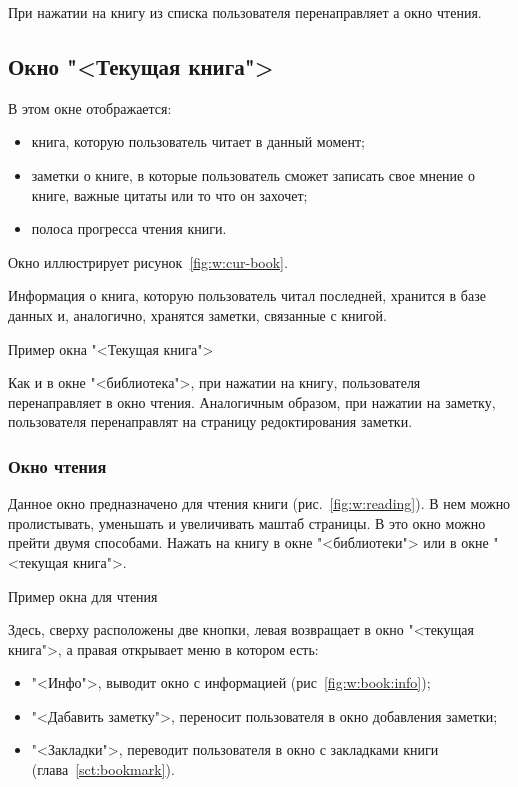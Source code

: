 При нажатии на книгу из списка пользователя перенаправляет а окно
чтения.\par

\subsection{Окно "<Текущая книга">}
В этом окне отображается:
\begin{itemize}
	\item книга, которую пользователь читает в данный момент;
	\item заметки о книге, в которые пользователь сможет записать
		свое мнение о книге, важные цитаты или то что он захочет;
	\item полоса прогресса чтения книги.
\end{itemize}

Окно иллюстрирует рисунок~\ref{fig:w:cur-book}.\par
Информация о книга, которую пользователь читал
последней, хранится в базе данных и, аналогично,
хранятся заметки, связанные с книгой.

\begin{image}
	\caption{Пример окна "<Текущая книга">}
	\label{fig:w:cur-book}
\end{image}

Как и в окне "<библиотека">, при нажатии на книгу, пользователя
перенаправляет в окно чтения. Аналогичным образом,
при нажатии на заметку, пользователя перенаправлят на страницу
редоктирования заметки.

\subsubsection{Окно чтения}
Данное окно предназначено для чтения книги (рис.~\ref{fig:w:reading}).
В нем можно пролистывать, уменьшать и увеличивать маштаб страницы.
В это окно можно прейти двумя способами. Нажать на книгу в
окне "<библиотеки"> или в окне "<текущая книга">.

\begin{image}
	\caption{Пример окна для чтения}
	\label{fig:w:reading}
\end{image}

Здесь, сверху расположены две кнопки, левая возвращает в окно
"<текущая книга">, а правая открывает меню в котором есть:

\begin{itemize}
	\item "<Инфо">, выводит окно с информацией (рис~\ref{fig:w:book:info});
	\item "<Дабавить заметку">, переносит пользователя в окно добавления
		заметки;
	\item "<Закладки">, переводит пользователя в окно с закладками книги
		(глава~\ref{sct:bookmark}).
\end{itemize}

